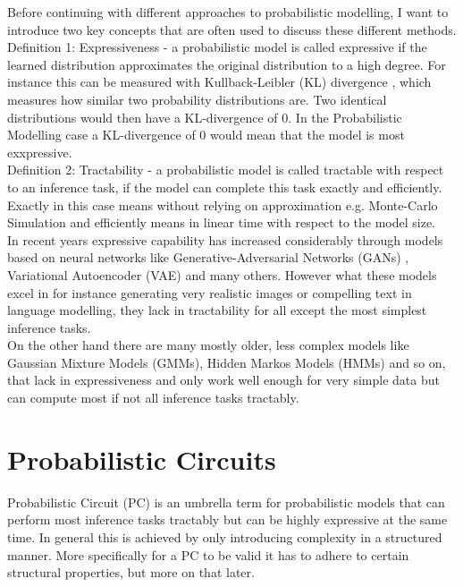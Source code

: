 
Before continuing with different approaches to probabilistic modelling, I want to introduce two key concepts that are often 
used to discuss these different methods. \\

Definition 1: Expressiveness - a probabilistic model is called expressive if the learned distribution approximates the original distribution to a high degree.
For instance this can be measured with Kullback-Leibler (KL) divergence \cite{kl_divergence}, which measures how similar two probability distributions are. 
Two identical distributions would then have a KL-divergence of $0$. In the Probabilistic Modelling case a KL-divergence of 0 would mean that the model is most exxpressive. \\

Definition 2: Tractability - a probabilistic model is called tractable with respect to an inference task, if the model can complete this 
task exactly and efficiently. Exactly in this case means without relying on approximation e.g. Monte-Carlo Simulation and efficiently 
means in linear time with respect to the model size. \\

In recent years expressive capability has increased considerably through models based on neural networks like Generative-Adversarial
Networks (GANs) \cite{gan}, Variational Autoencoder (VAE) \cite{vae} and many others. However what these models excel in for instance generating 
very realistic images or compelling text in language modelling, they lack in tractability for all except the most simplest inference tasks. 
\cite{pc_intro} \\

On the other hand there are many mostly older, less complex models like Gaussian Mixture Models (GMMs), Hidden Markos Models (HMMs) and so on, 
that lack in expressiveness and only work well enough for very simple data but can compute most if not all inference tasks tractably.

\section{Probabilistic Circuits}
\label{sec:pc}

Probabilistic Circuit (PC) is an umbrella term for probabilistic models that can perform most inference tasks tractably but can be 
highly expressive at the same time. In general this is achieved by only introducing complexity in a structured manner. More specifically
for a PC to be valid it has to adhere to certain structural properties, but more on that later. \\

